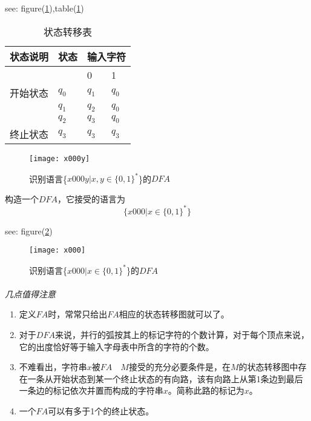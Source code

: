 \begin{example}
	see: figure(\ref{fig:x000y}),table(\ref{tab:x000y})
	\begin{table}
		\caption{状态转移表}
		\label{tab:x000y}       %
		\begin{tabular}{|p{1.3cm}|p{0.7cm}|p{0.7cm}|p{0.7cm}|}
			\hline 
			状态说明 & 状态 & \multicolumn{2}{c|}{输入字符} \\ 
			\hline 
			&  & 0 & 1 \\ 
			\hline 
			开始状态 & $q_0$ & $q_1$ & $q_0$ \\ 
			\hline 
			& $q_1$ & $q_2$ & $q_0$ \\ 
			\hline 
			& $q_2$ & $q_3$ & $q_0$ \\ 
			\hline 
			终止状态 & $q_3$ & $q_3$ & $q_3$ \\ 
			\hline 
		\end{tabular} 
    \end{table}
    \begin{figure}[htbp]
    	\texttt{[image: x000y]}
    	\caption{识别语言\{$x000y|x,y\in\{0,1\}^{\ast}$\}的$DFA$}
    	\label{fig:x000y}       %
    \end{figure}
\end{example}

\begin{example}构造一个$DFA$，它接受的语言为
	\[\{x000|x\in\{0,1\}^{\ast}\}\]
	
	see: figure(\ref{fig:x000})
	\begin{figure}[htbp]
		\texttt{[image: x000]}
		\caption{识别语言\{$x000|x\in\{0,1\}^{\ast}$\}的$DFA$}
		\label{fig:x000}       %
	\end{figure}
\end{example}

\paragraph{}
\begin{note}\emph{几点值得注意}
	\begin{enumerate}
		\item 定义$FA$时，常常只给出$FA$相应的状态转移图就可以了。 
		\item 对于$DFA$来说，并行的弧按其上的标记字符的个数计算，对于每个顶点来说，它的出度恰好等于输入字母表中所含的字符的个数。 
		\item 不难看出，字符串$x$被$FA\quad M$接受的充分必要条件是，在$M$的状态转移图中存在一条从开始状态到某一个终止状态的有向路，该有向路上从第1条边到最后一条边的标记依次并置而构成的字符串$x$。简称此路的标记为$x$。 
		\item 一个$FA$可以有多于1个的终止状态。 
	\end{enumerate}
\end{note}


